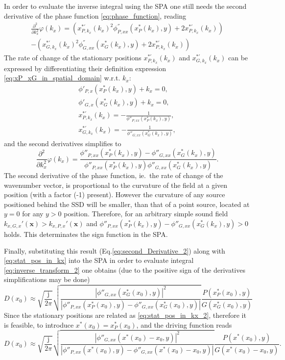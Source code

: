 \documentclass[12pt,a4paper]{article}
\newcommand{\ti}{\mathrm{j}}
\newcommand{\vx}{\mathbf{x}}
\begin{document}
In order to evaluate the inverse integral using the SPA one still needs the second derivative of the phase function \eqref{eq:phase_function}, reading
\begin{multline}
\frac{\partial^2}{\partial k_x^2} \varphi(k_x) = 
 \left( x^{*'}_{P,k_x}(k_x)^2 \phi_{P,xx}^{''}(x^*_P (k_x),y)  + 2 x^{*'}_{P,k_x}(k_x)\right) 
\\
-\left( x^{*'}_{G,k_x}(k_x)^2 \phi_{G,xx}^{''}(x^*_G(k_x),y)  +  2 x^{*'}_{P,k_x}(k_x)\right) 
\label{eq:second_Derivative}
\end{multline}
The rate of change of the stationary positions $ x^{*'}_{P,k_x}(k_x)$ and $ x^{*'}_{G,k_x}(k_x)$ can be expressed by differentiating their definition expression \eqref{eq:xP_xG_in_spatial_domain} w.r.t. $k_x$:
\begin{eqnarray}
\phi'_{P,x}(x^*_P(k_x),y) + k_x = 0, \\
\phi'_{G,x}(x^*_G(k_x),y) + k_x = 0, \\
x^{*'}_{P,k_x}(k_x) = -\frac{1}{ \phi{''}_{P,xx}(x^*_P(k_x),y) }, \\
x^{*'}_{G,k_x}(k_x) = -\frac{1}{ \phi{''}_{G,xx}(x^*_G(k_x),y) }, 
\end{eqnarray}
and the second derivatives simplifies to
\begin{equation}
\frac{\partial^2}{\partial k_x^2} \varphi(k_x) = \frac{ \phi{''}_{P,xx}(x^*_P(k_x),y) - \phi{''}_{G,xx}(x^*_G(k_x),y)}{\phi{''}_{P,xx}(x^*_P(k_x),y) \phi{''}_{G,xx}(x^*_G(k_x),y)}.
\label{eq:second_Derivative_2}
\end{equation}
The second derivative of the phase function, ie.\ the rate of change of the wavenumber vector, is proportional to the curvature of the field at a given position (with a factor (-1) present).
However the curvature of any source positioned behind the SSD will be smaller, than that of a point source, located at $y = 0$ for any $y>0$ position.
Therefore, for an arbitrary simple sound field $k_{x,G,x}'(\vx) > k_{x,P,x}'(\vx)$ and $\phi{''}_{P,xx}(x^*_P(k_x),y) - \phi{''}_{G,xx}(x^*_G(k_x),y) >0$ holds.
This determinates the sign function in the SPA.

Finally, substituting this result (Eq.\eqref{eq:second_Derivative_2}) along with \eqref{eq:stat_pos_in_kx} into the SPA in order to evaluate integral \eqref{eq:inverse_transform_2} one obtains (due to the positive sign of the derivatives simplifications may be done)
\begin{equation}
D(x_0) \approx
\sqrt{\frac{\ti}{2\pi}} 
\sqrt{\frac{ \left| \phi{''}_{G,xx}(x^*_G(x_0),y )\right|^2}{\left| \phi{''}_{P,xx}(x^*_P(x_0),y) - \phi{''}_{G,xx}(x^*_G(x_0),y)\right|}}
\frac{P(x^*_P(x_0),y)}{G(x^*_G(x_0),y)}
\end{equation}
Since the stationary positions are related as \eqref{eq:stat_pos_in_kx_2}, therefore it is feasible, to introduce $x^*(x_0) = x^*_P(x_0)$, and the driving function reads
\begin{equation}
D(x_0) \approx
\sqrt{\frac{\ti}{2\pi}} 
\sqrt{\frac{ \left| \phi{''}_{G,xx}(x^*(x_0)-x_0,y )\right|^2}{\left| \phi{''}_{P,xx}(x^*(x_0),y) - \phi{''}_{G,xx}(x^*(x_0) - x_0,y)\right|}}
\frac{P(x^*(x_0),y)}{G(x^*(x_0) - x_0,y)}.
\label{eq:spatial_sdm}
\end{equation}
\end{document}
